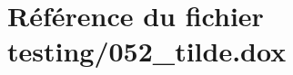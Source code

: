 \hypertarget{052__tilde_8dox}{}\section{Référence du fichier testing/052\+\_\+tilde.dox}
\label{052__tilde_8dox}
